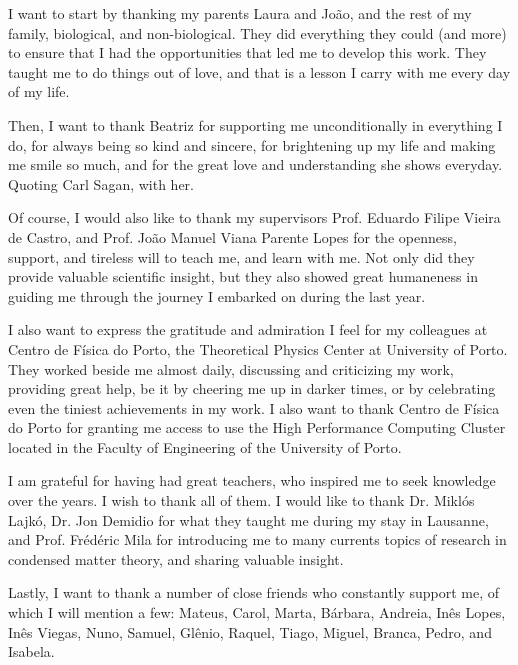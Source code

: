 
\begin{acknowledgments} 

I want to start by thanking my parents Laura and João, and the rest of my family, biological, and non-biological.
They did everything they could (and more) to ensure that I had the opportunities that led me to develop this work.
They taught me to do things out of love, and that is a lesson I carry with me every day of my life.

Then, I want to thank Beatriz for supporting me unconditionally in everything I do, for always being  so kind and sincere, for brightening up my life and making me smile so much, and for the great love and understanding she shows everyday.
Quoting Carl Sagan,  with her.

Of course, I would also like to thank my supervisors Prof. Eduardo Filipe Vieira de Castro, and Prof. João Manuel Viana Parente Lopes for the openness, support, and tireless will to teach me, and learn with me.
Not only did they provide valuable scientific insight, but they also showed great humaneness in guiding me through the journey I embarked on during the last year.

I also want to express the gratitude and admiration I feel for my colleagues at Centro de Física do Porto, the Theoretical Physics Center at University of Porto.
They worked beside me almost daily, discussing and criticizing my work, providing great help, be it by cheering me up in darker times, or by celebrating even the tiniest achievements in my work.
I also want to thank Centro de Física do Porto for granting me access to use the High Performance Computing Cluster located in the Faculty of Engineering of the University of Porto.

I am grateful for having had great teachers, who inspired me to seek knowledge over the years. I wish to thank all of them. %
I would like to thank Dr. Miklós Lajkó, Dr. Jon Demidio for what they taught me during my stay in Lausanne, and Prof. Frédéric Mila for introducing me to many currents topics of research in condensed matter theory, and sharing valuable insight.

Lastly, I want to thank a number of close friends who constantly support me, of which I will mention a few: Mateus, Carol, Marta, Bárbara,  Andreia, Inês Lopes, Inês Viegas, Nuno, Samuel, Glênio, Raquel, Tiago, Miguel, Branca, Pedro, and Isabela. 

\end{acknowledgments}
\clearpage
\thispagestyle{empty}
\cleardoublepage